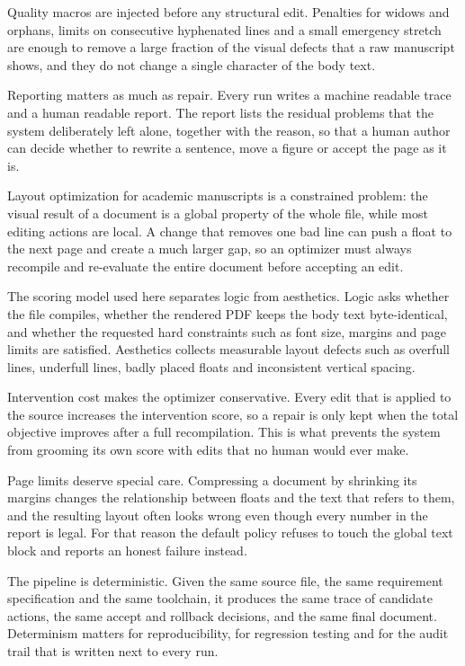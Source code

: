 \documentclass[10pt,a4paper]{article}
\begin{document}
Quality macros are injected before any structural edit. Penalties for widows and orphans, limits on consecutive hyphenated lines and a small emergency stretch are enough to remove a large fraction of the visual defects that a raw manuscript shows, and they do not change a single character of the body text.

Reporting matters as much as repair. Every run writes a machine readable trace and a human readable report. The report lists the residual problems that the system deliberately left alone, together with the reason, so that a human author can decide whether to rewrite a sentence, move a figure or accept the page as it is.

Layout optimization for academic manuscripts is a constrained problem: the visual result of a document is a global property of the whole file, while most editing actions are local. A change that removes one bad line can push a float to the next page and create a much larger gap, so an optimizer must always recompile and re-evaluate the entire document before accepting an edit.

The scoring model used here separates logic from aesthetics. Logic asks whether the file compiles, whether the rendered PDF keeps the body text byte-identical, and whether the requested hard constraints such as font size, margins and page limits are satisfied. Aesthetics collects measurable layout defects such as overfull lines, underfull lines, badly placed floats and inconsistent vertical spacing.

Intervention cost makes the optimizer conservative. Every edit that is applied to the source increases the intervention score, so a repair is only kept when the total objective improves after a full recompilation. This is what prevents the system from grooming its own score with edits that no human would ever make.

Page limits deserve special care. Compressing a document by shrinking its margins changes the relationship between floats and the text that refers to them, and the resulting layout often looks wrong even though every number in the report is legal. For that reason the default policy refuses to touch the global text block and reports an honest failure instead.

The pipeline is deterministic. Given the same source file, the same requirement specification and the same toolchain, it produces the same trace of candidate actions, the same accept and rollback decisions, and the same final document. Determinism matters for reproducibility, for regression testing and for the audit trail that is written next to every run.
\end{document}
